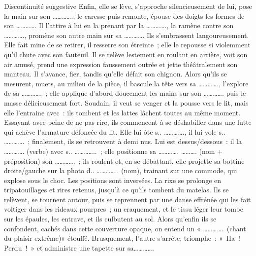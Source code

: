 \documentclass{parch}
\begin{document}
\begin{parchArticle}{Discontinuité suggestive}
		Enfin, elle se lève, s'approche silencieusement de lui, pose la main sur son …………., le caresse puis remonte, épouse des doigts les formes de son …………. Il l'attire à lui en la prenant par la …………., la ramène contre son …………., promène son autre main sur sa …………. Ils s'embrassent langoureusement. Elle fait mine de se retirer, il resserre son étreinte ; elle le repousse si violemment qu'il chute avec son fauteuil. Il se relève lestement en roulant en arrière, voit son air amusé, prend une expression faussement outrée et jette théâtralement son manteau. Il s'avance, fier, tandis qu'elle défait son chignon. Alors qu'ils se mesurent, muets, au milieu de la pièce, il bascule la tête vers sa …………., l'explore de sa …………. ; elle applique d'abord doucement les mains sur son …………. puis le masse délicieusement fort. Soudain, il veut se venger et la pousse vers le lit, mais elle l'entraine avec : ils tombent et les lattes lâchent toutes au même moment. Essayant avec peine de ne pas rire, ils commencent à se déshabiller dans une lutte qui achève l'armature défoncée du lit. Elle lui ôte s.. …………., il lui vole s.. …………. ; finalement, ils se retrouvent à demi nus. Lui est dessus/dessous : il la …………. (verbe) avec s.. ………….. ; elle positionne sa …………. ………. (nom + préposition) son …………. ; ils roulent et, en se débattant, elle projette sa bottine droite/gauche sur la photo d.. ………….. (nom), trainant sur une commode, qui explose sous le choc. Les positions sont inversées. La rixe se prolonge en tripatouillages et rires retenus, jusqu'à ce qu'ils tombent du matelas. Ils se relèvent, se tournent autour, puis se reprennent par une danse effrénée qui les fait voltiger dans les rideaux pourpres ; un craquement, et le tissu léger leur tombe sur les épaules, les entrave, et ils culbutent au sol. Alors qu'enfin ils se confondent, cachés dans cette couverture opaque, on entend un « …………. (chant du plaisir extrême)» étouffé. Brusquement, l'autre s'arrête, triomphe : « Ha ! Perdu ! » et administre une tapette sur sa………….
	\end{parchArticle}
	
\end{document}
